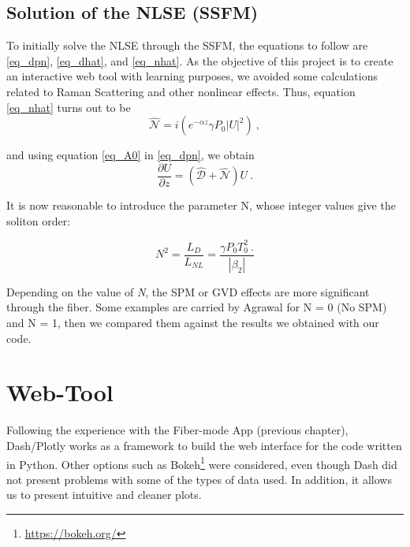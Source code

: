         \subsection{Solution of the NLSE (SSFM)}
            To initially solve the NLSE through the SSFM, the equations to follow are \eqref{eq_dpn}, \eqref{eq_dhat}, and \eqref{eq_nhat}. As the objective of this project is to create an interactive web tool with learning purposes, we avoided some calculations related to Raman Scattering and other nonlinear effects. Thus, equation \eqref{eq_nhat} turns out to be 
            \begin{equation} \label{eq_nhat2}
             \hat{\mathcal{N}} = i \left( 
             e^{-\alpha z} \gamma P_0 \left|U\right|^2 
             \right) \ ,
        \end{equation}
        
        and using equation \eqref{eq_A0} in \eqref{eq_dpn}, we obtain
        \begin{equation}\label{eq_dpn2}
            \frac{\partial U}{\partial z} = \left( \hat{\mathcal{D}} + \hat{\mathcal{N}} \right) U \ . 
        \end{equation}
        
        It is now reasonable to introduce the parameter N, whose integer values give the soliton order:
        
        \begin{equation}\label{eq_n}
            N^2 = \frac{L_D}{L_{NL}} = \frac{\gamma P_0 T^2_0 \ . }{\left|\beta_2\right|}
        \end{equation}
        
        
        Depending on the value of \emph{N}, the SPM or GVD effects are more significant through the fiber. Some examples are carried by Agrawal \citep{AgrawalBook} for N = 0 (No SPM) and N = 1, then we compared them against the results we obtained with our code.    

\section{Web-Tool}
    Following the experience with the Fiber-mode App (previous chapter), Dash/Plotly works as a framework to build the web interface for the code written in Python. Other options such as Bokeh\footnote{\url{https://bokeh.org/}}  were considered, even though Dash did not present problems with some of the types of data used. In addition, it allows us to present intuitive and cleaner plots. 
    
